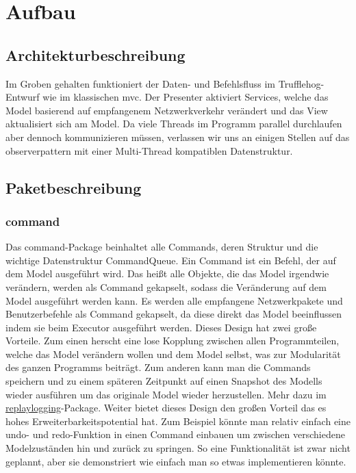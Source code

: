 \chapter{Aufbau \programname}

\section{Architekturbeschreibung}
Im Groben gehalten funktioniert der Daten- und Befehlsfluss im Trufflehog-Entwurf
wie im klassischen \gls{mvc}. Der Presenter aktiviert Services, welche das Model basierend
auf empfangenem Netzwerkverkehr verändert und das View aktualisiert sich am Model.
Da viele Threads im Programm parallel durchlaufen aber dennoch kommunizieren müssen,
verlassen wir uns an einigen Stellen auf das \gls{observerpattern} mit einer
Multi-Thread kompatiblen Datenstruktur.\newline
\newline

\section{Paketbeschreibung}

\subsection{command}
\label{subsec:command}
Das command-Package beinhaltet alle Commands, deren Struktur und die wichtige Datenstruktur CommandQueue. Ein Command ist ein Befehl, der auf
dem Model ausgeführt wird. Das heißt alle Objekte, die das Model irgendwie verändern,
werden als Command gekapselt, sodass die Veränderung auf dem Model
ausgeführt werden kann. Es werden alle empfangene Netzwerkpakete 
und Benutzerbefehle als Command gekapselt, da diese direkt das Model beeinflussen
indem sie beim Executor ausgeführt werden.
\newline
\newline
Dieses Design hat zwei große Vorteile. Zum einen herscht eine lose Kopplung zwischen
allen Programmteilen, welche das Model verändern wollen und dem Model selbst, was zur Modularität des ganzen
Programms beiträgt. Zum anderen kann man die Commands speichern und zu einem
späteren Zeitpunkt auf einen Snapshot des Modells wieder ausführen um das originale
Model wieder herzustellen. Mehr dazu im
\hyperref[subsubsec:replaylogging]{replaylogging}-Package. Weiter bietet dieses
Design den großen Vorteil das es hohes Erweiterbarkeitspotential hat. Zum Beispiel
könnte man relativ einfach eine undo- und redo-Funktion in einen Command einbauen um
zwischen verschiedene Modelzuständen hin und zurück zu springen. So eine
Funktionalität ist zwar nicht geplannt, aber sie demonstriert wie einfach man so
etwas implementieren könnte.
\newline
\newline

